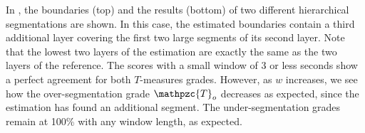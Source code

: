 \documentclass{article}
\def\shag{\ensuremath{\mathpzc{T}}}
\begin{document}

In , the boundaries (top) and the results (bottom) of two different hierarchical segmentations are shown.
In this case, the estimated boundaries contain a third additional layer covering the first two large segments of its second layer.
Note that the lowest two layers of the estimation are exactly the same as the two layers of the reference.
The scores with a small window of 3 or less seconds show a perfect agreement for both $T$-measures grades.
However, as $w$ increases, we see how the over-segmentation grade $\shag_o$ decreases as expected, since the estimation has found an additional segment.
The under-segmentation grades remain at 100\% with any window length, as expected.
\end{document}

